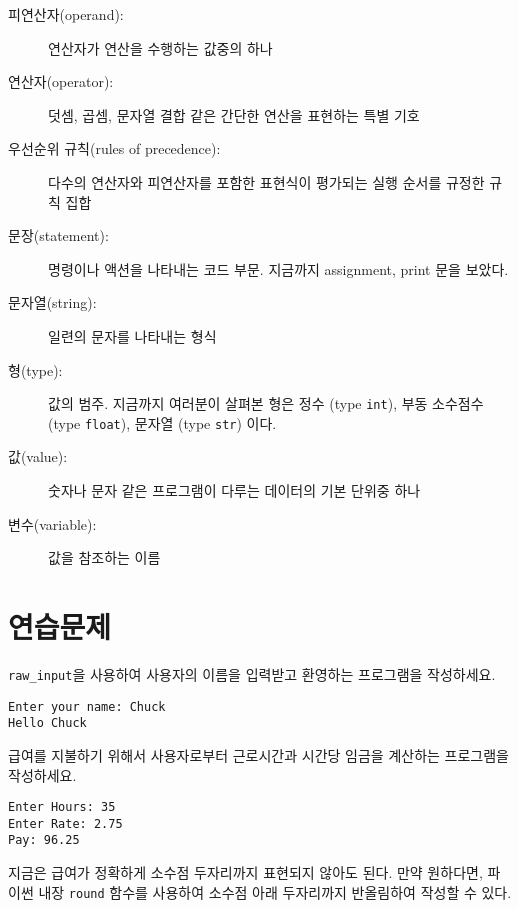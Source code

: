 \begin{description}
\item[피연산자(operand):] 연산자가 연산을 수행하는 값중의 하나

\item[연산자(operator):] 덧셈, 곱셈, 문자열 결합 같은 간단한 연산을 표현하는 특별 기호

\item[우선순위 규칙(rules of precedence):] 다수의 연산자와 피연산자를 포함한 표현식이 평가되는 실행 순서를 규정한 규칙 집합

\item[문장(statement):] 명령이나 액션을 나타내는 코드 부문. 지금까지 assignment, print 문을 보았다.

\item[문자열(string):] 일련의 문자를 나타내는 형식

\item[형(type):] 값의 범주. 지금까지 여러분이 살펴본 형은 정수 (type {\tt int}), 부동 소수점수 (type {\tt float}), 문자열 (type {\tt str}) 이다.

\item[값(value):] 숫자나 문자 같은 프로그램이 다루는 데이터의 기본 단위중 하나

\item[변수(variable):] 값을 참조하는 이름

\end{description}

\section{연습문제}

\begin{ex}
\verb"raw_input"을 사용하여 사용자의 이름을 입력받고 환영하는 프로그램을 작성하세요.

\begin{verbatim}
Enter your name: Chuck
Hello Chuck
\end{verbatim}

\end{ex}

\begin{ex}
급여를 지불하기 위해서 사용자로부터 근로시간과 시간당 임금을 계산하는 프로그램을 작성하세요.
\begin{verbatim}
Enter Hours: 35
Enter Rate: 2.75
Pay: 96.25
\end{verbatim}
\end{ex}
%
지금은 급여가 정확하게 소수점 두자리까지 표현되지 않아도 된다. 
만약 원하다면, 파이썬 내장 {\tt round} 함수를 사용하여 소수점 아래 두자리까지 반올림하여 작성할 수 있다.

